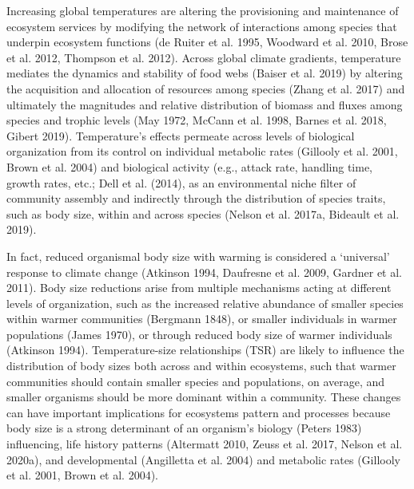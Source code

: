 \documentclass[
]{article}
\begin{document}
Increasing global temperatures are altering the provisioning and
maintenance of ecosystem services by modifying the network of
interactions among species that underpin ecosystem functions (de Ruiter
et al. 1995, Woodward et al. 2010, Brose et al. 2012, Thompson et al.
2012). Across global climate gradients, temperature mediates the
dynamics and stability of food webs (Baiser et al. 2019) by altering the
acquisition and allocation of resources among species (Zhang et al.
2017) and ultimately the magnitudes and relative distribution of biomass
and fluxes among species and trophic levels (May 1972, McCann et al.
1998, Barnes et al. 2018, Gibert 2019). Temperature's effects permeate
across levels of biological organization from its control on individual
metabolic rates (Gillooly et al. 2001, Brown et al. 2004) and biological
activity (e.g., attack rate, handling time, growth rates, etc.; Dell et
al. (2014), as an environmental niche filter of community assembly and
indirectly through the distribution of species traits, such as body
size, within and across species (Nelson et al. 2017a, Bideault et al.
2019).

In fact, reduced organismal body size with warming is considered a
`universal' response to climate change (Atkinson 1994, Daufresne et al.
2009, Gardner et al. 2011). Body size reductions arise from multiple
mechanisms acting at different levels of organization, such as the
increased relative abundance of smaller species within warmer
communities (Bergmann 1848), or smaller individuals in warmer
populations (James 1970), or through reduced body size of warmer
individuals (Atkinson 1994). Temperature-size relationships (TSR) are
likely to influence the distribution of body sizes both across and
within ecosystems, such that warmer communities should contain smaller
species and populations, on average, and smaller organisms should be
more dominant within a community. These changes can have important
implications for ecosystems pattern and processes because body size is a
strong determinant of an organism's biology (Peters 1983) influencing,
life history patterns (Altermatt 2010, Zeuss et al. 2017, Nelson et al.
2020a), and developmental (Angilletta et al. 2004) and metabolic rates
(Gillooly et al. 2001, Brown et al. 2004).
\end{document}
